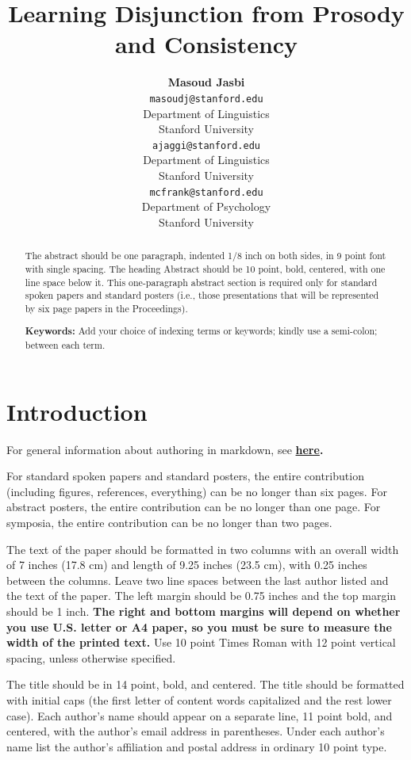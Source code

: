 \documentclass[10pt, letterpaper]{article}
\title{Learning Disjunction from Prosody and Consistency}
\author{{\large \bf Masoud Jasbi} \\ \texttt{masoudj@stanford.edu} \\ Department of Linguistics \\ Stanford University \And {\large \bf Akshay Jaggi} \\ \texttt{ajaggi@stanford.edu} \\ Department of Linguistics \\ Stanford University \And {\large \bf Michael C. Frank} \\ \texttt{mcfrank@stanford.edu} \\ Department of Psychology \\ Stanford University }
\begin{document}
\maketitle

\begin{abstract}
The abstract should be one paragraph, indented 1/8 inch on both sides,
in 9 point font with single spacing. The heading Abstract should be 10
point, bold, centered, with one line space below it. This one-paragraph
abstract section is required only for standard spoken papers and
standard posters (i.e., those presentations that will be represented by
six page papers in the Proceedings).

\textbf{Keywords:}
Add your choice of indexing terms or keywords; kindly use a semi-colon;
between each term.
\end{abstract}

\section{Introduction}\label{introduction}

For general information about authoring in markdown, see
\textbf{\href{http://rmarkdown.rstudio.com/authoring_basics.html}{here}.}

For standard spoken papers and standard posters, the entire contribution
(including figures, references, everything) can be no longer than six
pages. For abstract posters, the entire contribution can be no longer
than one page. For symposia, the entire contribution can be no longer
than two pages.

The text of the paper should be formatted in two columns with an overall
width of 7 inches (17.8 cm) and length of 9.25 inches (23.5 cm), with
0.25 inches between the columns. Leave two line spaces between the last
author listed and the text of the paper. The left margin should be 0.75
inches and the top margin should be 1 inch.
\textbf{The right and bottom margins will depend on whether you use
U.S. letter or A4 paper, so you must be sure to measure the width of
the printed text.} Use 10 point Times Roman with 12 point vertical
spacing, unless otherwise specified.

The title should be in 14 point, bold, and centered. The title should be
formatted with initial caps (the first letter of content words
capitalized and the rest lower case). Each author's name should appear
on a separate line, 11 point bold, and centered, with the author's email
address in parentheses. Under each author's name list the author's
affiliation and postal address in ordinary 10 point type.
\end{document}
